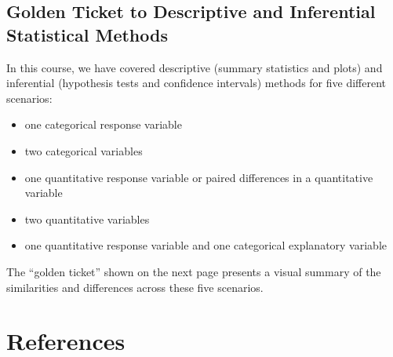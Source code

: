 \documentclass[
]{report}
\providecommand{\tightlist}{%
  \setlength{\itemsep}{0pt}\setlength{\parskip}{0pt}}
\begin{document}
\newpage

\section{Golden Ticket to Descriptive and Inferential Statistical Methods}\label{golden-ticket-to-descriptive-and-inferential-statistical-methods}

In this course, we have covered descriptive (summary statistics and plots) and inferential (hypothesis tests and confidence intervals) methods for five different scenarios:

\begin{itemize}
\tightlist
\item
  one categorical response variable
\item
  two categorical variables
\item
  one quantitative response variable or paired differences in a quantitative variable
\item
  two quantitative variables
\item
  one quantitative response variable and one categorical explanatory variable
\end{itemize}

The ``golden ticket'' shown on the next page presents a visual summary of the similarities and differences across these five scenarios.



\chapter*{References}\label{references}
\end{document}
